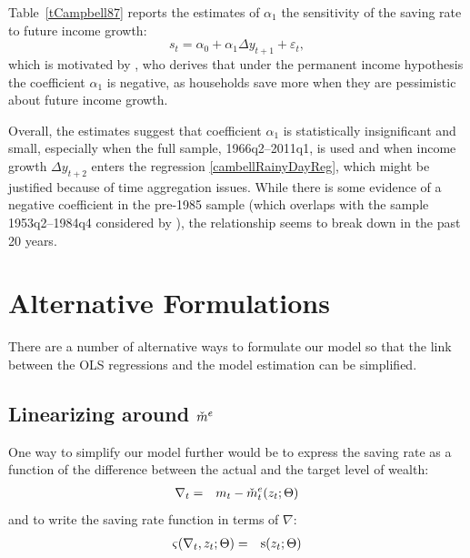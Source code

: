 \documentclass[titlepage]{\econtex}
\begin{document}
Table~\ref{tCampbell87} reports the estimates of $\alpha_1$ the sensitivity of the saving rate to future income growth:
\begin{equation}
s_t=\alpha_0+\alpha_1 \Delta y_{t+1}+ \varepsilon_t, \label{cambellRainyDayReg}
\end{equation}
which is motivated by \cite{cam87}, who derives that under the permanent income hypothesis the coefficient $\alpha_1$ is negative, as households save more when they are pessimistic about future income growth.

Overall, the estimates suggest that coefficient $\alpha_1$ is statistically insignificant and small, especially when the full sample, 1966q2--2011q1, is used and when income growth $\Delta y_{t+2}$ enters the regression \eqref{cambellRainyDayReg}, which might be justified because of time aggregation issues. While there is some evidence of a negative coefficient in the pre-1985 sample (which overlaps with the sample 1953q2--1984q4 considered by \cite{cam87}), the relationship seems to break down in the past 20 years.


\newpage











\clearpage\newpage\pagebreak

\hypertarget{Alternative-Formulations}{}
\section{Alternative Formulations}

There are a number of alternative ways to formulate our model so that the link between the OLS regressions and the model estimation can be simplified.

\subsection{Linearizing around $\check{m}^{e}$}

One way to simplify our model further would be to express the saving rate as a function of the difference between the actual and the target level of wealth:
\begin{eqnarray}
  \nabla_{t} & = & m_{t} - \check{m}^{e}_{t}(z_{t};\Theta)
\end{eqnarray}
and to write the saving rate function in terms of $\nabla$:
\begin{eqnarray}
  \varsigma(\nabla_{t},z_{t};\Theta) & = & \mathrm{s}(z_{t};\Theta)
\end{eqnarray}
\end{document}
